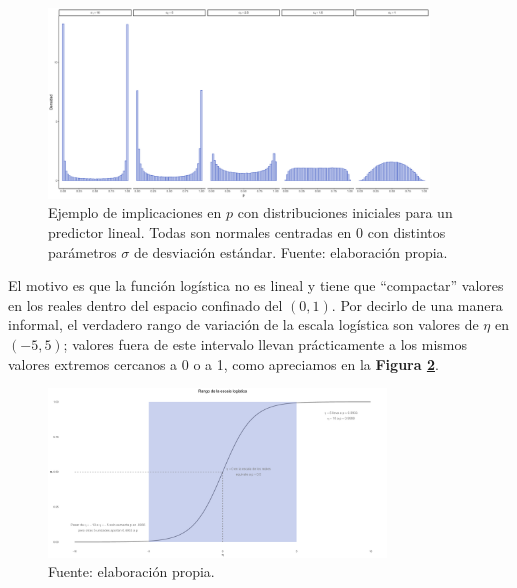 \begin{figure}[h]
	\centering
	\includegraphics[width = 0.9\textwidth]{Figs/Modelado/Malas_Iniciales}
	\caption{Ejemplo de implicaciones en $p$ con distribuciones iniciales para un predictor lineal. Todas son normales centradas en $0$ con distintos parámetros $\sigma$ de desviación estándar. Fuente: elaboración propia.}
	\label{fig:Malas_Iniciales}
\end{figure}

El motivo es que la función logística no es lineal y tiene que ``compactar'' valores en los reales dentro del espacio confinado del $\left(0,1\right)$. Por decirlo de una manera informal, el verdadero rango de variación de la escala logística son valores de $\eta$ en $(-5,5)$; valores fuera de este intervalo llevan prácticamente a los mismos valores extremos cercanos a 0 o a 1, como apreciamos en la \textbf{Figura \ref{fig:Escala_Logis}}.\\

\begin{figure}[h]
	\centering
	\includegraphics[width = 0.8\textwidth]{Figs/Modelado/Escala_Logis}
	\caption{Fuente: elaboración propia.}
	\label{fig:Escala_Logis}
\end{figure}

